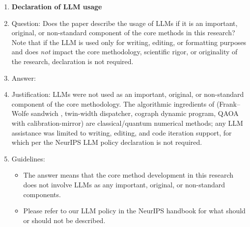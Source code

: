 \begin{enumerate}
\item {\bf Declaration of LLM usage}
    \item[] Question: Does the paper describe the usage of LLMs if it is an important, original, or non-standard component of the core methods in this research? Note that if the LLM is used only for writing, editing, or formatting purposes and does \emph{not} impact the core methodology, scientific rigor, or originality of the research, declaration is not required.
    \item[] Answer: \answerNA{} %
    \item[] Justification: LLMs were not used as an important, original,
        or non-standard component of the core methodology. The
        algorithmic ingredients of \ZornQ (Frank--Wolfe sandwich \SDP,
        twin-width dispatcher, cograph dynamic program, QAOA with
        calibration-mirror) are classical/quantum numerical methods;
        any LLM assistance was limited to writing, editing, and code
        iteration support, for which per the NeurIPS LLM policy
        declaration is not required.
    \item[] Guidelines:
    \begin{itemize}
        \item The answer \answerNA{} means that the core method development in this research does not involve LLMs as any important, original, or non-standard components.
        \item Please refer to our LLM policy in the NeurIPS handbook for what should or should not be described.
    \end{itemize}

\end{enumerate}
